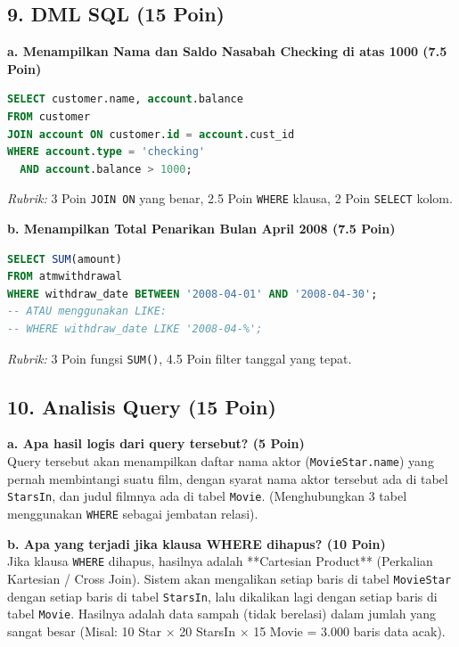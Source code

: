 \documentclass[11pt,a4paper]{article}
\begin{document}
\subsection*{9. DML SQL (15 Poin)}
\textbf{a. Menampilkan Nama dan Saldo Nasabah Checking di atas 1000 (7.5 Poin)}
\begin{lstlisting}[language=SQL]
SELECT customer.name, account.balance
FROM customer
JOIN account ON customer.id = account.cust_id
WHERE account.type = 'checking'
  AND account.balance > 1000;
\end{lstlisting}
\textit{Rubrik:} 3 Poin \texttt{JOIN ON} yang benar, 2.5 Poin \texttt{WHERE} klausa, 2 Poin \texttt{SELECT} kolom.

\textbf{b. Menampilkan Total Penarikan Bulan April 2008 (7.5 Poin)}
\begin{lstlisting}[language=SQL]
SELECT SUM(amount)
FROM atmwithdrawal
WHERE withdraw_date BETWEEN '2008-04-01' AND '2008-04-30';
-- ATAU menggunakan LIKE:
-- WHERE withdraw_date LIKE '2008-04-%';
\end{lstlisting}
\textit{Rubrik:} 3 Poin fungsi \texttt{SUM()}, 4.5 Poin filter tanggal yang tepat.

\subsection*{10. Analisis Query (15 Poin)}
\textbf{a. Apa hasil logis dari query tersebut? (5 Poin)}\\
Query tersebut akan menampilkan daftar nama aktor (\texttt{MovieStar.name}) yang pernah membintangi suatu film, dengan syarat nama aktor tersebut ada di tabel \texttt{StarsIn}, dan judul filmnya ada di tabel \texttt{Movie}. (Menghubungkan 3 tabel menggunakan \texttt{WHERE} sebagai jembatan relasi).

\textbf{b. Apa yang terjadi jika klausa WHERE dihapus? (10 Poin)}\\
Jika klausa \texttt{WHERE} dihapus, hasilnya adalah **Cartesian Product** (Perkalian Kartesian / Cross Join).
Sistem akan mengalikan setiap baris di tabel \texttt{MovieStar} dengan setiap baris di tabel \texttt{StarsIn}, lalu dikalikan lagi dengan setiap baris di tabel \texttt{Movie}.
Hasilnya adalah data sampah (tidak berelasi) dalam jumlah yang sangat besar (Misal: 10 Star $\times$ 20 StarsIn $\times$ 15 Movie = 3.000 baris data acak).
\end{document}
